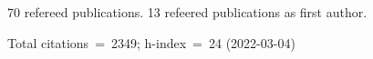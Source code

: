 70 refereed publications. 13 refeered publications as first author.

Total citations~=~2349; h-index~=~24 (2022-03-04)